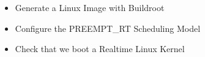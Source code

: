 {
  \begin{itemize}
    \item Generate a Linux Image with Buildroot
    \item Configure the PREEMPT\_RT Scheduling Model
    \item Check that we boot a Realtime Linux Kernel
  \end{itemize}
}
